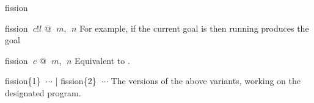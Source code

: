 \begin{tactic}{fission}
\begin{tsyntax}{fission $\;c$!$l$ @ $\;m$, $\;n$}
    \medskip For example, if the current goal is
     then
    running 
    produces the goal
  \end{tsyntax}

  \begin{tsyntax}{fission $\;c$ @ $\;m$, $\;n$}
    Equivalent to .
  \end{tsyntax}

  \begin{tsyntax}{fission\{1\} $\;\cdots$ | fission\{2\} $\;\cdots$}
    The \prhl versions of the above variants, working on the
    designated program.
  \end{tsyntax}
\end{tactic}
